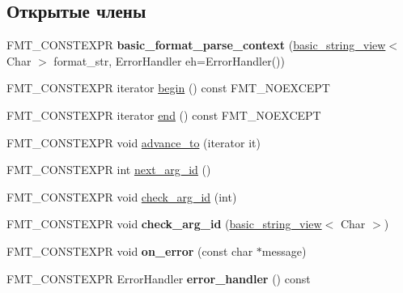 \subsection*{Открытые члены}
\begin{DoxyCompactItemize}
\item 
\mbox{\label{classbasic__format__parse__context_abc0b6ad2da572bb18c581c454cda322e}} 
F\+M\+T\+\_\+\+C\+O\+N\+S\+T\+E\+X\+PR {\bfseries basic\+\_\+format\+\_\+parse\+\_\+context} (\hyperlink{classbasic__string__view}{basic\+\_\+string\+\_\+view}$<$ Char $>$ format\+\_\+str, Error\+Handler eh=Error\+Handler())
\item 
F\+M\+T\+\_\+\+C\+O\+N\+S\+T\+E\+X\+PR iterator \hyperlink{classbasic__format__parse__context_a5c45c2385a7aa2a1da7a335f9ac42d9a}{begin} () const F\+M\+T\+\_\+\+N\+O\+E\+X\+C\+E\+PT
\item 
F\+M\+T\+\_\+\+C\+O\+N\+S\+T\+E\+X\+PR iterator \hyperlink{classbasic__format__parse__context_a02391d628854caf8c3416f21dec43b46}{end} () const F\+M\+T\+\_\+\+N\+O\+E\+X\+C\+E\+PT
\item 
F\+M\+T\+\_\+\+C\+O\+N\+S\+T\+E\+X\+PR void \hyperlink{classbasic__format__parse__context_ac123ab6c1c6e58db3ab0a917def4add8}{advance\+\_\+to} (iterator it)
\item 
F\+M\+T\+\_\+\+C\+O\+N\+S\+T\+E\+X\+PR int \hyperlink{classbasic__format__parse__context_a75c83556b48d6b5ee7b4866296888727}{next\+\_\+arg\+\_\+id} ()
\item 
F\+M\+T\+\_\+\+C\+O\+N\+S\+T\+E\+X\+PR void \hyperlink{classbasic__format__parse__context_a7a548535000cbd315a9ac35996950eec}{check\+\_\+arg\+\_\+id} (int)
\item 
\mbox{\label{classbasic__format__parse__context_a2c5adaac8abfa6bac5e65faae644d415}} 
F\+M\+T\+\_\+\+C\+O\+N\+S\+T\+E\+X\+PR void {\bfseries check\+\_\+arg\+\_\+id} (\hyperlink{classbasic__string__view}{basic\+\_\+string\+\_\+view}$<$ Char $>$)
\item 
\mbox{\label{classbasic__format__parse__context_a57d1f70a909bca84e69ffb8961d91563}} 
F\+M\+T\+\_\+\+C\+O\+N\+S\+T\+E\+X\+PR void {\bfseries on\+\_\+error} (const char $\ast$message)
\item 
\mbox{\label{classbasic__format__parse__context_a1c8ffcf0edde9301b419281f5d65a803}} 
F\+M\+T\+\_\+\+C\+O\+N\+S\+T\+E\+X\+PR Error\+Handler {\bfseries error\+\_\+handler} () const
\end{DoxyCompactItemize}


